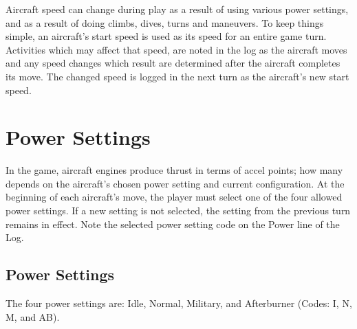 
\label{rule:changing-aircraft-speed}

Aircraft speed can change during play as a result of using various power settings, and as a result of doing climbs, dives, turns and maneuvers. To keep things simple, an aircraft's start speed is used as its speed for an entire game turn. Activities which may affect that speed, are noted in the log as the aircraft moves and any speed changes which result are determined after the aircraft completes its move. The changed speed is logged in the next turn as the aircraft's new start speed.

\section{Power Settings}
\label{rule:power-settings}

In the game, aircraft engines produce thrust in terms of accel points; how many depends on the aircraft's chosen power setting and current configuration. At the beginning of each aircraft's move, the player must select one of the four allowed power settings. If a new setting is not selected, the setting from the previous turn remains in effect. Note the selected power setting code on the Power line of the Log.

\subsection{Power Settings} The four power settings are: Idle, Normal, Military, and Afterburner (Codes: I, N, M, and AB).

